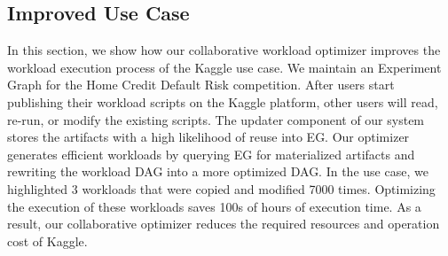 
\subsection{Improved Use Case}
In this section, we show how our collaborative workload optimizer improves the workload execution process of the Kaggle use case.
We maintain an Experiment Graph for the Home Credit Default Risk competition.
After users start publishing their workload scripts on the Kaggle platform, other users will read, re-run, or modify the existing scripts.
The updater component of our system stores the artifacts with a high likelihood of reuse into EG.
Our optimizer generates efficient workloads by querying EG for materialized artifacts and rewriting the workload DAG into a more optimized DAG.
In the use case, we highlighted 3 workloads that were copied and modified 7000 times.
Optimizing the execution of these workloads saves 100s of hours of execution time.
As a result, our collaborative optimizer reduces the required resources and operation cost of Kaggle.

